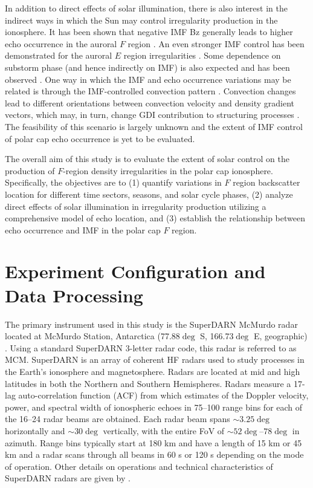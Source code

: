 In addition to direct effects of solar illumination, there is also interest in the indirect ways in which the Sun may control irregularity production in the ionosphere. It has been shown that negative IMF Bz generally leads to higher echo occurrence in the auroral \(F\) region \citep{Ballatore2001}. An even stronger IMF control has been demonstrated for the auroral \(E\) region irregularities \citep{Makarevich2012}. Some dependence on substorm phase (and hence indirectly on IMF) is also expected and has been observed \citep{Wild2008}. One way in which the IMF and echo occurrence variations may be related is through the IMF-controlled convection pattern \citep{Ruohoniemi1996,Pettigrew2010}. Convection changes lead to different orientations between convection velocity and density gradient vectors, which may, in turn, change GDI contribution to structuring processes \citep{Makarevich2014c}. The feasibility of this scenario is largely unknown and the extent of IMF control of polar cap echo occurrence is yet to be evaluated.

The overall aim of this study is to evaluate the extent of solar control on the production of \(F\)-region density irregularities in the polar cap ionosphere. Specifically, the objectives are to (1) quantify variations in \(F\) region backscatter location for different time sectors, seasons, and solar cycle phases, (2) analyze direct effects of solar illumination in irregularity production utilizing a comprehensive model of echo location, and (3)  establish the relationship between echo occurrence and IMF in the polar cap \(F\) region.


\section{Experiment Configuration and Data Processing}
\label{Sec:Exp}

The primary instrument used in this study is the SuperDARN McMurdo radar located at McMurdo Station, Antarctica (77.88\(\deg\) S, 166.73\(\deg\) E, geographic) \citep{Bristow2011}. Using a standard SuperDARN 3-letter radar code, this radar is referred to as MCM. SuperDARN is an array of coherent HF radars used to study processes in the Earth's ionosphere and magnetosphere. Radars are located at mid and high latitudes in both the Northern and Southern Hemispheres. Radars measure a 17-lag auto-correlation function (ACF) from which estimates of the Doppler velocity, power, and spectral width of ionospheric echoes in 75--100 range bins for each of the 16--24 radar beams are obtained. Each radar beam spans \(\sim3.25\deg\) horizontally and \(\sim30\deg\) vertically, with the entire FoV of \(\sim52\deg\)--\(78\deg\) in azimuth. Range bins typically start at 180 km and have a length of 15 km or 45 km and a radar scans through all beams in 60 s or 120 s depending on the mode of operation. Other details on operations and technical characteristics of SuperDARN radars are given by \citet{Chisham2007}.

